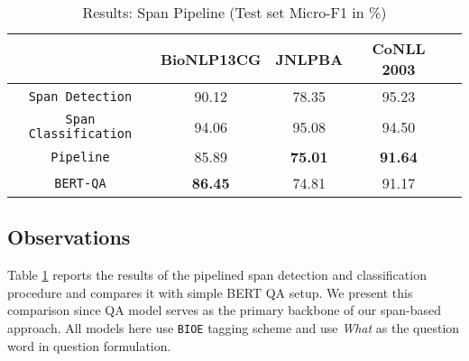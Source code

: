 \documentclass[11pt]{article}
\begin{document}
\begin{table}[h!]
\centering
\begin{tabular}{|c|c|c|c|c|}\hline
	\textbf{} & \textbf{BioNLP13CG} & \textbf{JNLPBA} & \textbf{CoNLL 2003}\\\hline
	\texttt{Span Detection} & 90.12 & 78.35 & 95.23\\\hline
	\texttt{Span Classification} & 94.06 & 95.08 & 94.50\\\hline
	\texttt{Pipeline} & 85.89 & \textbf{75.01} & \textbf{91.64}\\\hline
	\texttt{BERT-QA} & \textbf{86.45} & 74.81 & 91.17\\\hline
	\end{tabular}
    \caption{Results: Span Pipeline (Test set Micro-F1 in \%)}
    \label{tab:res_span}
\end{table}

\subsection{Observations}
Table \ref{tab:res_span} reports the results of the pipelined span detection and classification procedure and compares it with simple BERT QA setup. We present this comparison since QA model serves as the primary backbone of our span-based approach. All models here use \texttt{BIOE} tagging scheme and use \textit{What} as the question word in question formulation.
\end{document}
